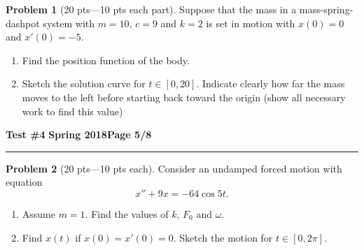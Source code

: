 \documentclass[12pt]{article}
\theoremstyle{definition}
\newtheorem{problem}{Problem}
\begin{document}
\bigskip
\begin{problem}[20 pts---10 pts each part]
Suppose that the mass in a mass-spring-dashpot system with $m=10$, $c=9$ and $k=2$ is set in motion with $x(0)=0$ and $x'(0)=-5$.
\begin{enumerate}
  \item Find the position function of the body.
  \vspace{4cm}
  \begin{flushright}
  \end{flushright}
  \item Sketch the solution curve for $t \in [0, 20]$.  Indicate clearly how far the mass moves to the left before starting back toward the origin (show all necessary work to find this value)
\end{enumerate}
\end{problem}
\newpage

\hfill{\large\bf Test \#4}\hfill{\large\bf
  Spring 2018}\hfill{\large\bf Page 5/8}\hrule

\bigskip
\begin{problem}[20 pts---10 pts each]
Consider an undamped forced motion with equation 
\begin{equation*}
x''+9x=-64\cos 5t.
\end{equation*}
\begin{enumerate}
  \item Assume $m=1$.  Find the values of $k$, $F_0$ and $\omega$.
  \begin{flushright}
  \end{flushright}
  \item Find $x(t)$ if $x(0)=x'(0)=0$.  Sketch the motion for $t \in [0,2\pi]$. 
  \vspace{16cm}
  \begin{flushright}
  \end{flushright}
\end{enumerate}
\end{problem}
\newpage
\end{document}
